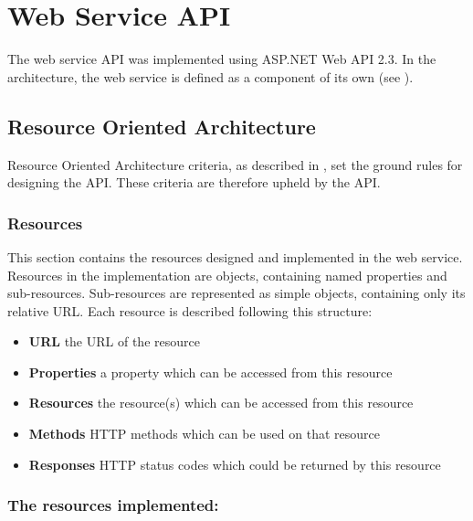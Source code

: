 \section{Web Service API}\label{design:web_service}
The web service API was implemented using ASP.NET Web API 2.3\cite{aspnet_webapi}.
In the architecture, the web service is defined as a component of its own (see ).

\subsection{Resource Oriented Architecture}
Resource Oriented Architecture criteria, as described in , set the ground rules for designing the API.
These criteria are therefore upheld by the API.

\subsubsection{Resources}\label{webservice:resources}
This section contains the resources designed and implemented in the web service.
Resources in the implementation are objects, containing named properties and sub-resources.
Sub-resources are represented as simple objects, containing only its relative URL.
Each resource is described following this structure:
\begin{itemize}
\item \textbf{URL} the URL of the resource
\item \textbf{Properties} a property which can be accessed from this resource
\item \textbf{Resources} the resource(s) which can be accessed from this resource
\item \textbf{Methods} HTTP methods which can be used on that resource
\item \textbf{Responses} HTTP status codes which could be returned by this resource
\end{itemize}

\subsubsection*{The resources implemented:}
\newcommand{\resource}[6]{\noindent \vfill \fbox{\begin{minipage}{\textwidth}\begin{description}
\item[URL:]{\texttt{#1}}
\item[Properties:]{\texttt{#2}}
\item[Resources:]{\texttt{#3}}
\item[Methods:]{\texttt{#4}}
\item[Responses:]{\texttt{#5}}
\end{description}
{#6}
\end{minipage}
}\vfill }

